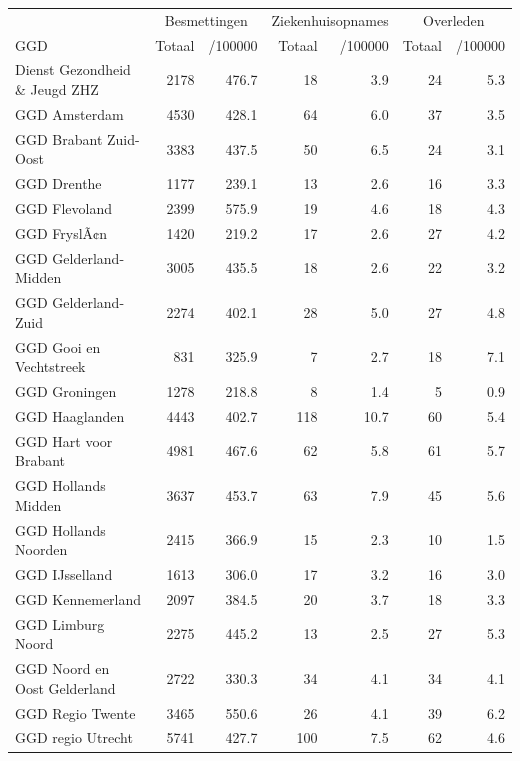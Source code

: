 \documentclass[
  english,
  man,floatsintext]{apa6}
\begin{document}
\begin{table}[H]
\centering\begingroup\fontsize{10}{12}\selectfont

\begin{threeparttable}
\begin{tabular}{lrrrrrr}
\toprule
\multicolumn{1}{c}{ } & \multicolumn{2}{c}{Besmettingen} & \multicolumn{2}{c}{Ziekenhuisopnames} & \multicolumn{2}{c}{Overleden} \\
\cmidrule(l{3pt}r{3pt}){2-3} \cmidrule(l{3pt}r{3pt}){4-5} \cmidrule(l{3pt}r{3pt}){6-7}
GGD & Totaal & /100000 & Totaal & /100000 & Totaal & /100000\\
\midrule
Dienst Gezondheid \& Jeugd ZHZ & 2178 & 476.7 & 18 & 3.9 & 24 & 5.3\\
GGD Amsterdam & 4530 & 428.1 & 64 & 6.0 & 37 & 3.5\\
GGD Brabant Zuid-Oost & 3383 & 437.5 & 50 & 6.5 & 24 & 3.1\\
GGD Drenthe & 1177 & 239.1 & 13 & 2.6 & 16 & 3.3\\
GGD Flevoland & 2399 & 575.9 & 19 & 4.6 & 18 & 4.3\\
GGD FryslÃ¢n & 1420 & 219.2 & 17 & 2.6 & 27 & 4.2\\
GGD Gelderland-Midden & 3005 & 435.5 & 18 & 2.6 & 22 & 3.2\\
GGD Gelderland-Zuid & 2274 & 402.1 & 28 & 5.0 & 27 & 4.8\\
GGD Gooi en Vechtstreek & 831 & 325.9 & 7 & 2.7 & 18 & 7.1\\
GGD Groningen & 1278 & 218.8 & 8 & 1.4 & 5 & 0.9\\
GGD Haaglanden & 4443 & 402.7 & 118 & 10.7 & 60 & 5.4\\
GGD Hart voor Brabant & 4981 & 467.6 & 62 & 5.8 & 61 & 5.7\\
GGD Hollands Midden & 3637 & 453.7 & 63 & 7.9 & 45 & 5.6\\
GGD Hollands Noorden & 2415 & 366.9 & 15 & 2.3 & 10 & 1.5\\
GGD IJsselland & 1613 & 306.0 & 17 & 3.2 & 16 & 3.0\\
GGD Kennemerland & 2097 & 384.5 & 20 & 3.7 & 18 & 3.3\\
GGD Limburg Noord & 2275 & 445.2 & 13 & 2.5 & 27 & 5.3\\
GGD Noord en Oost Gelderland & 2722 & 330.3 & 34 & 4.1 & 34 & 4.1\\
GGD Regio Twente & 3465 & 550.6 & 26 & 4.1 & 39 & 6.2\\
GGD regio Utrecht & 5741 & 427.7 & 100 & 7.5 & 62 & 4.6\\

\end{tabular}
\end{threeparttable}
\end{table}
\end{document}
